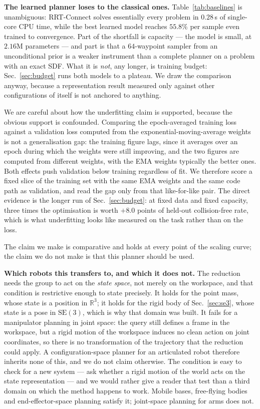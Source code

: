 \documentclass[10pt,twocolumn,letterpaper]{article}
\theoremstyle{plain}
\newcommand{\SE}{\mathrm{SE}(3)}
\begin{document}
\textbf{The learned planner loses to the classical ones.} Table~\ref{tab:baselines}
is unambiguous: RRT-Connect solves essentially every problem in $0.28$\,s of
single-core CPU time, while the best learned model reaches $55.8\%$ per sample even
trained to convergence. Part of the shortfall is capacity --- the model is small,
at $2.16$M parameters --- and part is that a $64$-waypoint sampler from an
unconditional prior is a weaker instrument than a complete planner on a problem
with an exact SDF. What it is \emph{not}, any longer, is training budget:
Sec.~\ref{sec:budget} runs both models to a plateau. We draw the comparison anyway,
because a representation result measured only against other configurations of
itself is not anchored to anything.

We are careful about how the underfitting claim is supported, because the obvious
support is confounded. Comparing the epoch-averaged training loss against a
validation loss computed from the exponential-moving-average weights is not a
generalisation gap: the training figure lags, since it averages over an epoch
during which the weights were still improving, and the two figures are computed
from different weights, with the EMA weights typically the better ones. Both
effects push validation below training regardless of fit. We therefore score a
fixed slice of the training set with the same EMA weights and the same code path
as validation, and read the gap only from that like-for-like pair. The direct
evidence is the longer run of Sec.~\ref{sec:budget}: at fixed data and fixed
capacity, three times the optimisation is worth $+8.0$ points of held-out
collision-free rate, which is what underfitting looks like measured on the task
rather than on the loss.

The claim we make is comparative and holds at every point of the scaling
curve; the claim we do not make is that this planner should be used.

\textbf{Which robots this transfers to, and which it does not.} The reduction
needs the group to act on the \emph{state space}, not merely on the workspace,
and that condition is restrictive enough to state precisely. It holds for the
point mass, whose state is a position in $\mathbb{R}^3$; it holds for the
rigid body of Sec.~\ref{sec:se3}, whose state is a pose in $\SE$, which is why
that domain was built. It fails for a manipulator planning in joint space: the
query still defines a frame in the workspace, but a rigid motion of the
workspace induces no clean action on joint coordinates, so there is no
transformation of the trajectory that the reduction could apply. A
configuration-space planner for an articulated robot therefore inherits none of
this, and we do not claim otherwise. The condition is easy to check for a new
system --- ask whether a rigid motion of the world acts on the state
representation --- and we would rather give a reader that test than a third
domain on which the method happens to work. Mobile bases, free-flying bodies and
end-effector-space planning satisfy it; joint-space planning for arms does not.
\end{document}
